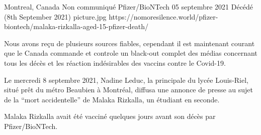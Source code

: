 {Montreal, Canada}
{Non communiqué}
{Pfizer/BioNTech}
{05 septembre 2021}
{Décédé (8th September 2021)}
{picture.jpg}
{https://nomoresilence.world/pfizer-biontech/malaka-rizkalla-aged-15-pfizer-death/}
{

Nous avons reçu de plusieurs sources fiables, cependant il est maintenant
courant que le Canada commande et controle un black-out complet des médias
concernant tous les décès et les réaction indésirables des vaccins contre le
Covid-19.

Le mercredi 8 septembre 2021, Nadine Leduc, la principale du lycée Louis-Riel,
situé prêt du métro Beaubien à Montréal, diffusa une annonce de presse au sujet
de la “mort accidentelle” de Malaka Rizkalla, un étudiant en seconde.

Malaka Rizkalla avait été vacciné quelques jours avant son décès par
Pfizer/BioNTech.

}
